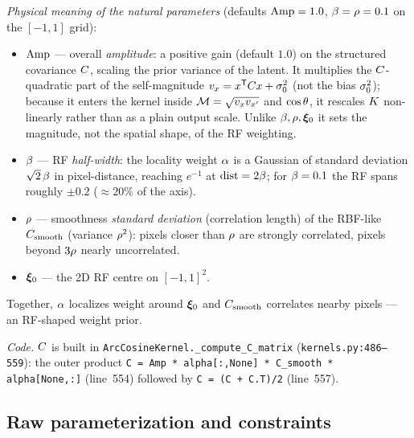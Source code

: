 \emph{Physical meaning of the natural parameters} (defaults $\mathrm{Amp}=1.0$,
$\beta=\rho=0.1$ on the $[-1,1]$ grid):
\begin{itemize}[leftmargin=1.4em]
\item $\mathrm{Amp}$ --- overall \emph{amplitude}: a positive gain (default $1.0$) on the
  structured covariance $C$, scaling the prior variance of the latent. It
  multiplies the $C$-quadratic part of the self-magnitude
  $v_x=x^{\mathsf{T}}C x+\sigma_{0}^2$ (not the bias $\sigma_{0}^2$); because it enters
  the kernel inside $\mathcal{M}=\sqrt{v_xv_{x'}}$ and $\cos\theta$, it rescales
  $K$ non-linearly rather than as a plain output scale. Unlike $\beta,\rho,\bm{\xi}_{0}$
  it sets the magnitude, not the spatial shape, of the RF weighting.
\item $\beta$ --- RF \emph{half-width}: the locality weight $\alpha$ is a Gaussian of
  standard deviation $\sqrt{2}\,\beta$ in pixel-distance, reaching $e^{-1}$ at
  $\text{dist}=2\beta$; for $\beta=0.1$ the RF spans roughly $\pm0.2$ ($\approx20\%$
  of the axis).
\item $\rho$ --- smoothness \emph{standard deviation} (correlation length) of the
  RBF-like $C_{\mathrm{smooth}}$ (variance $\rho^2$): pixels closer than $\rho$ are strongly
  correlated, pixels beyond $3\rho$ nearly uncorrelated.
\item $\bm{\xi}_{0}$ --- the 2D RF centre on $[-1,1]^2$.
\end{itemize}
Together, $\alpha$ localizes weight around $\bm{\xi}_{0}$ and $C_{\mathrm{smooth}}$ correlates nearby pixels
--- an RF-shaped weight prior.

\emph{Code.} $C$ is built in \texttt{ArcCosineKernel.\_compute\_C\_matrix}
(\texttt{kernels.py:486--559}): the outer product
\texttt{C = Amp * alpha[:,None] * C\_smooth * alpha[None,:]} (line~554) followed by
\texttt{C = (C + C.T)/2} (line~557).

\subsection{Raw parameterization and constraints}
\label{subsec:rawparam}

